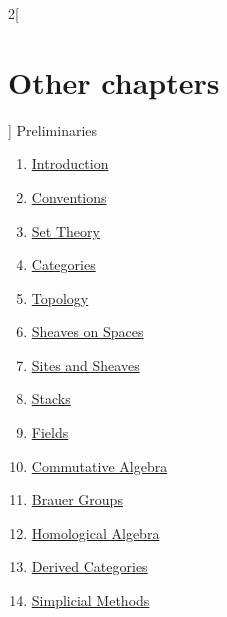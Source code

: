 \begin{multicols}{2}[\section{Other chapters}]
\noindent
Preliminaries
\begin{enumerate}
\item \href{https://github.com/stacks/stacks-project/blob/a04446e57ec1fbc252a871afcec7752fb2807b14/introduction.tex}{Introduction}
\item \href{https://github.com/stacks/stacks-project/blob/a04446e57ec1fbc252a871afcec7752fb2807b14/conventions.tex}{Conventions}
\item \href{https://github.com/stacks/stacks-project/blob/a04446e57ec1fbc252a871afcec7752fb2807b14/sets.tex}{Set Theory}
\item \href{https://github.com/stacks/stacks-project/blob/a04446e57ec1fbc252a871afcec7752fb2807b14/categories.tex}{Categories}
\item \href{https://github.com/stacks/stacks-project/blob/a04446e57ec1fbc252a871afcec7752fb2807b14/topology.tex}{Topology}
\item \href{https://github.com/stacks/stacks-project/blob/a04446e57ec1fbc252a871afcec7752fb2807b14/sheaves.tex}{Sheaves on Spaces}
\item \href{https://github.com/stacks/stacks-project/blob/a04446e57ec1fbc252a871afcec7752fb2807b14/sites.tex}{Sites and Sheaves}
\item \href{https://github.com/stacks/stacks-project/blob/a04446e57ec1fbc252a871afcec7752fb2807b14/stacks.tex}{Stacks}
\item \href{https://github.com/stacks/stacks-project/blob/a04446e57ec1fbc252a871afcec7752fb2807b14/fields.tex}{Fields}
\item \href{https://github.com/stacks/stacks-project/blob/a04446e57ec1fbc252a871afcec7752fb2807b14/algebra.tex}{Commutative Algebra}
\item \href{https://github.com/stacks/stacks-project/blob/a04446e57ec1fbc252a871afcec7752fb2807b14/brauer.tex}{Brauer Groups}
\item \href{https://github.com/stacks/stacks-project/blob/a04446e57ec1fbc252a871afcec7752fb2807b14/homology.tex}{Homological Algebra}
\item \href{https://github.com/stacks/stacks-project/blob/a04446e57ec1fbc252a871afcec7752fb2807b14/derived.tex}{Derived Categories}
\item \href{https://github.com/stacks/stacks-project/blob/a04446e57ec1fbc252a871afcec7752fb2807b14/simplicial.tex}{Simplicial Methods}

\end{enumerate}
\end{multicols}
